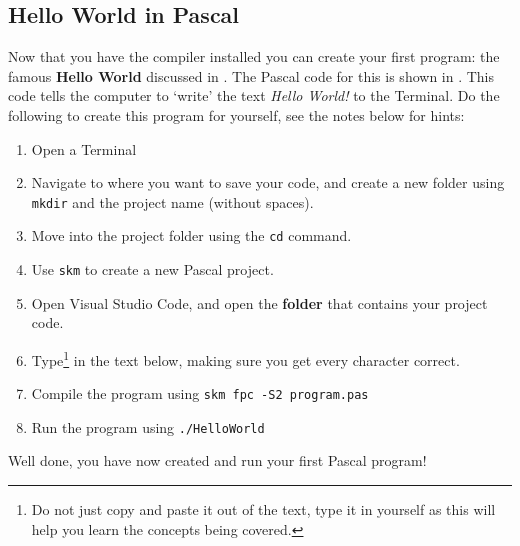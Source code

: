\subsection{Hello World in Pascal} %
\label{sub:hello_world_in_pascal}

Now that you have the compiler installed you can create your first program: the famous \textbf{Hello World} discussed in . The Pascal code for this is shown in . This code tells the computer to `write' the text \emph{Hello World!} to the Terminal. Do the following to create this program for yourself, see the notes below for hints:

\begin{enumerate}
  \item Open a Terminal
  \item Navigate to where you want to save your code, and create a new folder using \texttt{mkdir} and the project name (without spaces).
  \item Move into the project folder using the \texttt{cd} command.
  \item Use \texttt{skm} to create a new Pascal project.
  \item Open Visual Studio Code, and open the \textbf{folder} that contains your project code.
  \item Type\footnote{Do not just copy and paste it out of the text, type it in yourself as this will help you learn the concepts being covered.} in the text below, making sure you get every character correct.
  \item Compile the program using \texttt{skm fpc -S2 program.pas}
  \item Run the program using \texttt{./HelloWorld}
\end{enumerate}

Well done, you have now created and run your first Pascal program!

\passection
{
}


